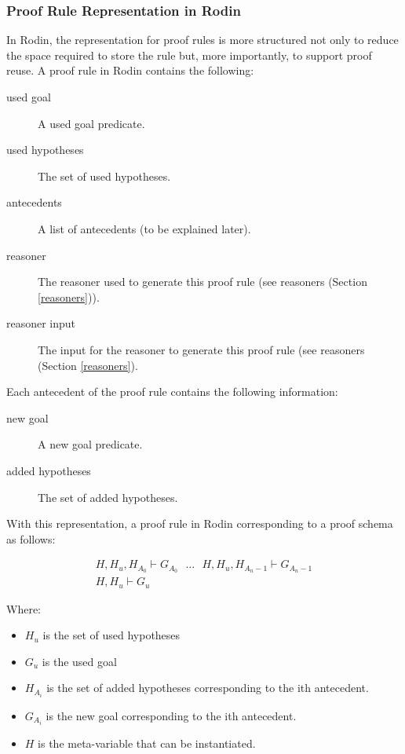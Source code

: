 
\subsubsection{Proof Rule Representation in Rodin}

In Rodin, the representation for proof rules is more structured not only to reduce the space required to store the rule but, more importantly, to support proof reuse.
A proof rule in Rodin contains the following:

\begin{description}
	\item[used goal] A used goal predicate. 
	\item[used hypotheses] The set of used hypotheses. 
	\item[antecedents] A list of antecedents (to be explained later). 
	\item[reasoner] The reasoner used to generate this proof rule (see reasoners (Section \ref{reasoners})). 
	\item[reasoner input] The input for the reasoner to generate this proof rule (see reasoners (Section \ref{reasoners}). 
\end{description}

Each antecedent of the proof rule contains the following information:

\begin{description}
	\item[new goal] A new goal predicate. 
	\item[added hypotheses] The set of added hypotheses. 
\end{description}

With this representation, a proof rule in Rodin corresponding to a proof schema as follows: 

$$\begin{array}{c} H, H_u, H_{A_0} \vdash G_{A_0} ~~~\ldots~~~ H, H_u, H_{A_n-1} \vdash G_{A_n-1} \\ \hline H, H_u \vdash G_u \end{array} $$

Where:
\begin{itemize}
	\item     $H_u$ is the set of used hypotheses 
	\item     $G_u$ is the used goal 
	\item     $H_{A_i}$ is the set of added hypotheses corresponding to the ith antecedent. 
	\item     $G_{A_i}$ is the new goal corresponding to the ith antecedent. 
	\item     $H$ is the meta-variable that can be instantiated. 
\end{itemize}

